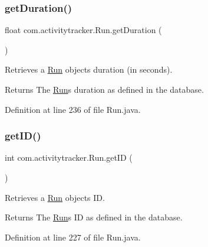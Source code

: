 \subsubsection{\texorpdfstring{getDuration()}{getDuration()}}
{\footnotesize\ttfamily float com.\+activitytracker.\+Run.\+get\+Duration (\begin{DoxyParamCaption}{ }\end{DoxyParamCaption})}

Retrieves a \mbox{\hyperlink{classcom_1_1activitytracker_1_1_run}{Run}} object\textquotesingle{}s duration (in seconds).

\begin{DoxyReturn}{Returns}
The \mbox{\hyperlink{classcom_1_1activitytracker_1_1_run}{Run}}\textquotesingle{}s duration as defined in the database. 
\end{DoxyReturn}


Definition at line 236 of file Run.\+java.


\begin{DoxyCode}{0}

\end{DoxyCode}
\mbox{\label{classcom_1_1activitytracker_1_1_run_a61916c14ab5a2bf6b080200f7d0c5566}} 
\subsubsection{\texorpdfstring{getID()}{getID()}}
{\footnotesize\ttfamily int com.\+activitytracker.\+Run.\+get\+ID (\begin{DoxyParamCaption}{ }\end{DoxyParamCaption})}

Retrieves a \mbox{\hyperlink{classcom_1_1activitytracker_1_1_run}{Run}} object\textquotesingle{}s ID.

\begin{DoxyReturn}{Returns}
The \mbox{\hyperlink{classcom_1_1activitytracker_1_1_run}{Run}}\textquotesingle{}s ID as defined in the database. 
\end{DoxyReturn}


Definition at line 227 of file Run.\+java.


